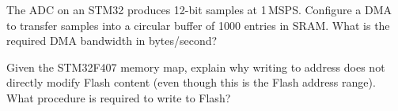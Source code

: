 \begin{exercise}
The ADC on an STM32 produces 12-bit samples at 1\,MSPS. Configure a DMA to transfer samples into a circular buffer of 1000 entries in SRAM. What is the required DMA bandwidth in bytes/second?
\end{exercise}

\begin{exercise}
Given the STM32F407 memory map, explain why writing to address  does not directly modify Flash content (even though this is the Flash address range). What procedure is required to write to Flash?
\end{exercise}

